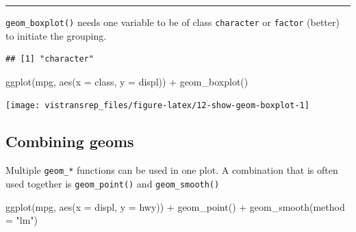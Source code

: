 \documentclass[]{book}
\newenvironment{Shaded}{}{}
\newcommand{\DataTypeTok}[1]{#1}
\newcommand{\KeywordTok}[1]{\textcolor[rgb]{0.00,0.00,1.00}{#1}}
\newcommand{\NormalTok}[1]{#1}
\newcommand{\OperatorTok}[1]{#1}
\newcommand{\StringTok}[1]{\textcolor[rgb]{0.00,0.50,0.50}{#1}}
\begin{document}
\begin{center}\rule{0.5\linewidth}{\linethickness}\end{center}

\texttt{geom\_boxplot()} needs one variable to be of class \texttt{character} or \texttt{factor} (better) to initiate the grouping.

\begin{Shaded}
\end{Shaded}

\begin{verbatim}
## [1] "character"
\end{verbatim}

\begin{Shaded}
\begin{Highlighting}[]
\KeywordTok{ggplot}\NormalTok{(mpg, }\KeywordTok{aes}\NormalTok{(}\DataTypeTok{x =}\NormalTok{ class, }\DataTypeTok{y =}\NormalTok{ displ)) }\OperatorTok{+}
\StringTok{  }\KeywordTok{geom_boxplot}\NormalTok{()}
\end{Highlighting}
\end{Shaded}

\begin{flushright}\texttt{[image: vistransrep\_files/figure-latex/12-show-geom-boxplot-1]} \end{flushright}

\hypertarget{combining-geoms}{%
\subsection{Combining geoms}\label{combining-geoms}}

Multiple \texttt{geom\_*} functions can be used in one plot.
A combination that is often used together is \texttt{geom\_point()} and \texttt{geom\_smooth()}

\begin{Shaded}
\begin{Highlighting}[]
\KeywordTok{ggplot}\NormalTok{(mpg, }\KeywordTok{aes}\NormalTok{(}\DataTypeTok{x =}\NormalTok{ displ, }\DataTypeTok{y =}\NormalTok{ hwy)) }\OperatorTok{+}
\StringTok{  }\KeywordTok{geom_point}\NormalTok{() }\OperatorTok{+}
\StringTok{  }\KeywordTok{geom_smooth}\NormalTok{(}\DataTypeTok{method =} \StringTok{"lm"}\NormalTok{)}
\end{Highlighting}
\end{Shaded}
\end{document}
